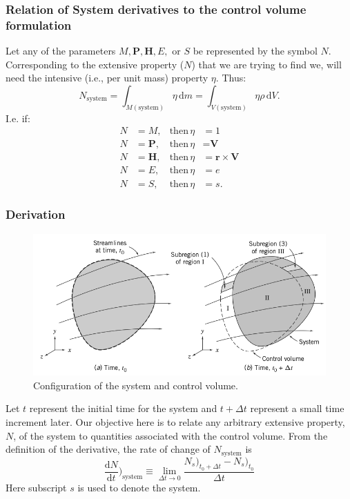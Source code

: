 \subsubsection{Relation of System derivatives to the control volume formulation}
Let any of the parameters $M, \textbf{P}, \textbf{H}, E,$ or $S$ be represented by the symbol $N$. Corresponding to the extensive property ($N$) that we are trying to find we, will need the intensive (i.e., per unit mass) property $\eta$. Thus:
\[ 
N_{\mathrm{system}} = \int_{M (\mathrm{system})} \eta \, \mathrm{d}m = \int_{V (\mathrm{system})} \eta \rho \, \mathrm{d}V
.\]
I.e. if:
\begin{align*}
  N &= M, & \mathrm{then} \,  \eta &= 1 \\
  N &= \textbf{P}, & \mathrm{then} \, \eta &= \textbf{V} \\
  N &= \textbf{H}, & \mathrm{then} \,  \eta &= \textbf{r} \times \textbf{V} \\
  N &= E, & \mathrm{then} \, \eta &= e \\
  N &= S, & \mathrm{then} \, \eta &= s
.\end{align*}

\subsubsection{Derivation}
\begin{figure} [ht]
  \centering
  \includegraphics[width=0.5\linewidth]{./figures/f4_1.png}
  \caption{Configuration of the system and control volume.}
  \label{fig:f4_1}
\end{figure}

Let $t$ represent the initial time for the system and $t + \Delta t$ represent a small time increment later. Our objective here is to relate any arbitrary extensive property, $N$, of the system to quantities associated with the control volume. From the definition of the derivative, the rate of change of $N_{\mathrm{system}}$ is
\begin{equation}\label{eq:sysder}
  \frac{\mathrm{d}N}{\mathrm{d}t} \bigg)_{\mathrm{system}} \equiv \lim_{\Delta t \to 0} \frac{N_s )_{t_0 + \Delta t} - N_s)_{t_0}}{\Delta t}
\end{equation}
Here subscript $s$ is used to denote the system.


